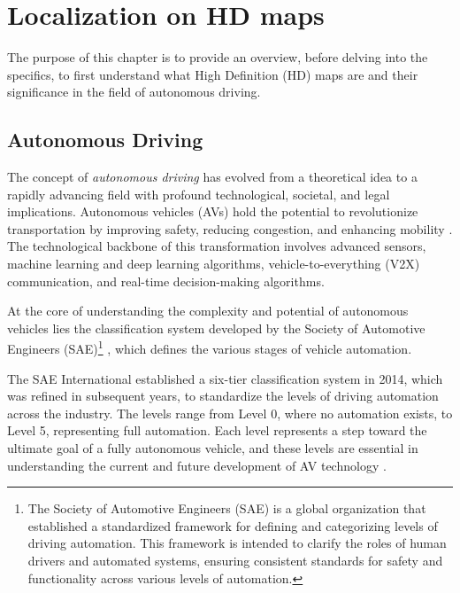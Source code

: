 \NoBgThispage
\chapter{Localization on HD maps}
The purpose of this chapter is to provide an overview, before delving into the specifics, to first understand what High Definition (HD) maps are and their significance in the field of autonomous driving.

\section{Autonomous Driving}
The concept of \textit{autonomous driving} has evolved from a theoretical idea to a rapidly advancing field with profound technological, societal, and legal implications. Autonomous vehicles (AVs) hold the potential to revolutionize transportation by improving safety, reducing congestion, and enhancing mobility \cite{9695620}. The technological backbone of this transformation involves advanced sensors, machine learning and deep learning algorithms, vehicle-to-everything (V2X) communication, and real-time decision-making algorithms.

At the core of understanding the complexity and potential of autonomous vehicles lies the classification system developed by the Society of Automotive Engineers (SAE)\footnote{The Society of Automotive Engineers (SAE) is a global organization that established a standardized framework for defining and categorizing levels of driving automation. This framework is intended to clarify the roles of human drivers and automated systems, ensuring consistent standards for safety and functionality across various levels of automation.} \cite{sae2021}, which defines the various stages of vehicle automation.

The SAE International established a six-tier classification system in 2014, which was refined in subsequent years, to standardize the levels of driving automation across the industry. The levels range from Level 0, where no automation exists, to Level 5, representing full automation. Each level represents a step toward the ultimate goal of a fully autonomous vehicle, and these levels are essential in understanding the current and future development of AV technology \cite{9881892}.

